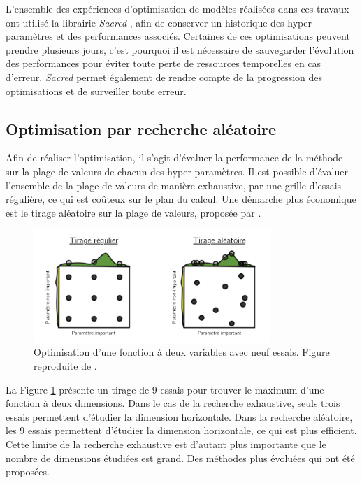 L'ensemble des expériences d'optimisation de modèles réalisées dans ces travaux ont utilisé la librairie \textit{Sacred} \cite{greff_sacred_2017}, afin de conserver un historique des hyper-paramètres et des performances associés.
Certaines de ces optimisations peuvent prendre plusieurs jours, c'est pourquoi il est nécessaire de sauvegarder l'évolution des performances pour éviter toute perte de ressources temporelles en cas d'erreur.
\textit{Sacred} permet également de rendre compte de la progression des optimisations et de surveiller toute erreur.

\subsection{Optimisation par recherche aléatoire} \label{subsec:random_search}
Afin de réaliser l'optimisation, il s'agit d'évaluer la performance de la méthode sur la plage de valeurs de chacun des hyper-paramètres.
Il est possible d'évaluer l'ensemble de la plage de valeurs de manière exhaustive, par une grille d'essais régulière, ce qui est coûteux sur le plan du calcul.
Une démarche plus économique est le tirage aléatoire sur la plage de valeurs, proposée par \citeauthor{bergstra_random_2012} \cite{bergstra_random_2012}.

\begin{figure}[hbtp]
	\centering
	\includegraphics[width=0.80\textwidth,height=\textheight,keepaspectratio]{../Chap4/Figures/bergstra_RandomSearch2002.png}
	\caption[Optimisation d'une fonction à deux variables avec neuf essais.]{Optimisation d'une fonction à deux variables avec neuf essais. Figure reproduite de \cite{bergstra_random_2012}.}
	\label{fig:random_search}
\end{figure}

La Figure \ref{fig:random_search} présente un tirage de 9 essais pour trouver le maximum d'une fonction à deux dimensions.
Dans le cas de la recherche exhaustive, seuls trois essais permettent d'étudier la dimension horizontale.
Dans la recherche aléatoire, les 9 essais permettent d'étudier la dimension horizontale, ce qui est plus efficient.
Cette limite de la recherche exhaustive est d'autant plus importante que le nombre de dimensions étudiées est grand.
Des méthodes plus évoluées qui ont été proposées.

